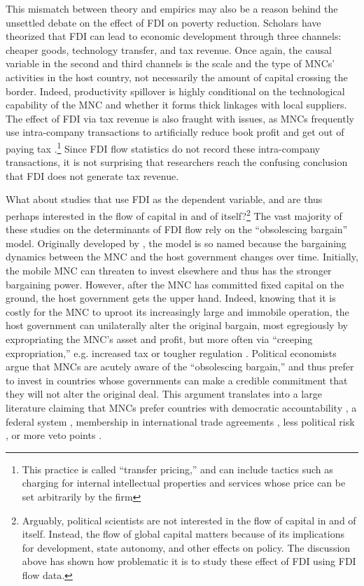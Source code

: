 This mismatch between theory and empirics may also be a reason behind the
unsettled debate on the effect of FDI on poverty reduction. Scholars have
theorized that FDI can lead to economic development through three channels:
cheaper goods, technology transfer, and tax revenue. Once again, the causal
variable in the second and third channels is the scale and the type of MNCs'
activities in the host country, not necessarily the amount of capital crossing
the border. Indeed, productivity spillover is highly conditional on the
technological capability of the MNC and whether it forms thick linkages with
local suppliers. The effect of FDI via tax revenue is also fraught with issues,
as MNCs frequently use intra-company transactions to artificially reduce book
profit and get out of paying tax \citep{Malesky2015c}.\footnote{This practice is
  called ``transfer pricing,'' and can include tactics such as charging for
  internal intellectual properties and services whose price can be set
  arbitrarily by the firm} Since FDI flow statistics do not record these
intra-company transactions, it is not surprising that researchers reach the
confusing conclusion that FDI does not generate tax revenue.

What about studies that use FDI as the dependent variable, and are thus perhaps
interested in the flow of capital in and of itself?\footnote{Arguably, political
  scientists are not interested in the flow of capital in and of itself.
  Instead, the flow of global capital matters because of its implications for
  development, state autonomy, and other effects on policy. The discussion above
  has shown how problematic it is to study these effect of FDI using FDI flow
  data.} The vast majority of these studies on the determinants of FDI flow rely
on the ``obsolescing bargain'' model. Originally developed by
\citet{Vernon1971}, the model is so named because the bargaining dynamics
between the MNC and the host government changes over time. Initially, the mobile
MNC can threaten to invest elsewhere and thus has the stronger bargaining power.
However, after the MNC has committed fixed capital on the ground, the host
government gets the upper hand. Indeed, knowing that it is costly for the MNC to
uproot its increasingly large and immobile operation, the host government can
unilaterally alter the original bargain, most egregiously by expropriating the
MNC's asset and profit, but more often via ``creeping expropriation,'' e.g.
increased tax or tougher regulation \citep{Li2009a}. Political economists argue
that MNCs are acutely aware of the ``obsolescing bargain,'' and thus prefer to
invest in countries whose governments can make a credible commitment that they
will not alter the original deal. This argument translates into a large
literature claiming that MNCs prefer countries with democratic accountability
\citep{Jensen2003}, a federal system \citep{Jensen2005}, membership in
international trade agreements \citep{Buthe2008}, less political risk
\citep{Beazer2011, Graham2010}, or more veto points \citep{Choi2008}.

